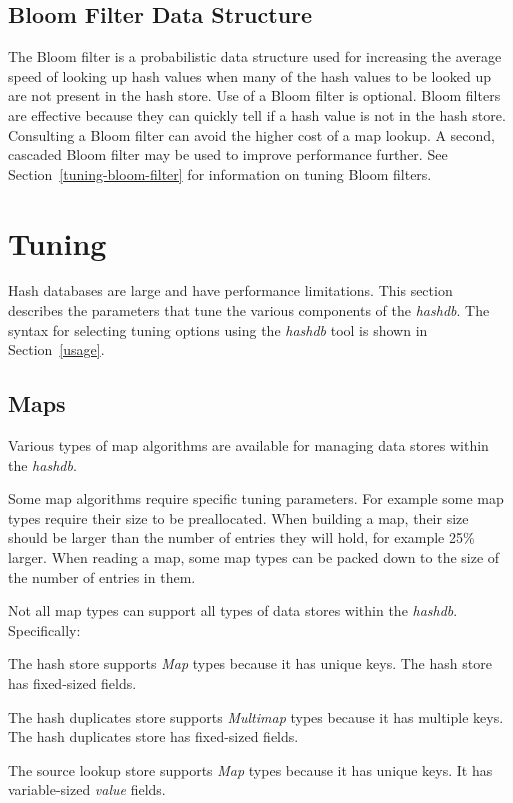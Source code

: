 \documentclass[12pt,twoside]{article}
\newcommand{\hdb}{\emph{hashdb}\xspace}
\begin{document}
\subsection{Bloom Filter Data Structure}
The Bloom filter is a probabilistic data structure used
for increasing the average speed of looking up hash values
when many of the hash values to be looked up are not present in the hash store.
Use of a Bloom filter is optional.
Bloom filters are effective because they can quickly tell if a hash value is not in the hash store.
Consulting a Bloom filter can avoid the higher cost of a map lookup.
A second, cascaded Bloom filter may be used to improve performance further.
See Section~\ref{tuning-bloom-filter} for information on tuning Bloom filters.

\section{Tuning\label{tuning}}
Hash databases are large and have performance limitations.
This section describes the parameters that tune the various components of the \hdb.
The syntax for selecting tuning options using the \hdb tool is shown in Section~\ref{usage}.

\subsection{Maps\label{tuning-map-type}}
Various types of map algorithms are available
for managing data stores within the \hdb.

Some map algorithms require specific tuning parameters.
For example some map types require their size to be preallocated.
When building a map, their size should be larger than the number of entries they will hold,
for example 25\% larger.
When reading a map, some map types can be packed down to the size of the number of entries in them.

Not all map types can support all types of data stores within the \hdb.
Specifically:
\begin{compactitem}
\item The hash store supports \emph{Map} types because it has unique keys.
The hash store has fixed-sized fields.
\item The hash duplicates store supports \emph{Multimap} types because it has multiple keys.
The hash duplicates store has fixed-sized fields.
\item The source lookup store supports \emph{Map} types because it has unique keys.
It has variable-sized \emph{value} fields.
\end{compactitem}
\end{document}
